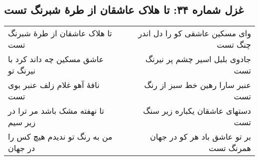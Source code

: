 \begin{center}
\section*{غزل شماره ۳۴: تا هلاک عاشقان از طرهٔ شبرنگ تست}
\label{sec:034}
\begin{longtable}{l p{0.5cm} r}
تا هلاک عاشقان از طرهٔ شبرنگ تست
&&
وای مسکین عاشقی کو را دل اندر چنگ تست
\\
عاشق مسکین چه داند کرد با نیرنگ تو
&&
جادوی بلبل اسیر چشم پر نیرنگ تست
\\
نافهٔ آهو غلام زلف عنبر بوی تست
&&
عنبر سارا رهین خط سبز از رنگ تست
\\
تا نهفته مشک باشد مر ترا در زیر سیم
&&
دستهای عاشقان یکباره زیر سنگ تست
\\
من به رنگ تو ندیدم هیچ کس را در جهان
&&
بر تو عاشق باد هر کو در جهان همرنگ تست
\\
\end{longtable}
\end{center}

